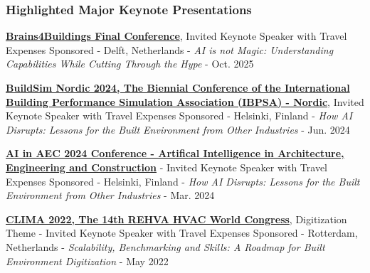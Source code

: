 \documentclass[10pt,a4paper]{article}
\begin{document}
\begin{small}
\subsubsection*{Highlighted Major Keynote Presentations}
\begin{etaremune}
\item
\textbf{\href{https://brains4buildings.org/eindconferentie-2025/}{Brains4Buildings Final Conference}}, Invited Keynote Speaker with Travel Expenses Sponsored - Delft, Netherlands - \emph{AI is not Magic: Understanding Capabilities While Cutting Through the Hype} - Oct. 2025
\item
\textbf{\href{https://buildsimnordic2024.ibpsa-nordic.org}{BuildSim Nordic 2024, The Biennial Conference of the International Building Performance Simulation Association (IBPSA) - Nordic}}, Invited Keynote Speaker with Travel Expenses Sponsored - Helsinki, Finland - \emph{How AI Disrupts: Lessons for the Built Environment from Other Industries} - Jun. 2024%
\item
\textbf{\href{https://www.dropbox.com/scl/fi/s0fdmi1zekiohg8pocjmd/ai-in-aec-2024-program.pdf?rlkey=u4scoo7n6eeleiir27do96gb1&dl=0}{AI in AEC 2024 Conference - Artifical Intelligence in Architecture, Engineering and Construction}} - Invited Keynote Speaker with Travel Expenses Sponsored - Helsinki, Finland - \emph{How AI Disrupts: Lessons for the Built Environment from Other Industries} - Mar. 2024%
\item
\textbf{\href{https://clima2022.org/extra_content/keynote-clayton-miller/}{CLIMA 2022, The 14th REHVA HVAC World Congress}}, Digitization Theme - Invited Keynote Speaker with Travel Expenses Sponsored - Rotterdam, Netherlands - \emph{Scalability, Benchmarking and Skills: A Roadmap for Built Environment Digitization} - May 2022%


\end{etaremune}
\end{small}
\end{document}
